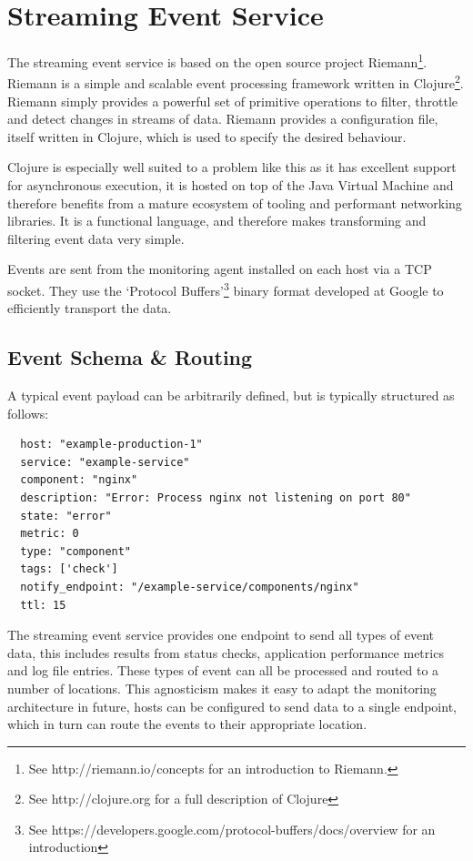 \documentclass{cshonours}
\begin{document}
\pagebreak
\section{Streaming Event Service}

The streaming event service is based on the open source project
Riemann\footnote{See http://riemann.io/concepts for an introduction to
Riemann.}. Riemann is a simple and scalable event processing framework written in Clojure\footnote{See http://clojure.org for a full description of Clojure}. Riemann simply provides a powerful set of primitive operations to filter, throttle and detect changes in streams of data. Riemann provides a configuration file, itself written in Clojure, which is used to specify the desired behaviour.

Clojure is especially well suited to a problem like this as it has excellent support for asynchronous execution, it is hosted on top of the Java Virtual Machine and therefore benefits from a mature ecosystem of tooling and performant networking libraries. It is a functional language, and therefore makes transforming and filtering event data very simple.

Events are sent from the monitoring agent installed on each host via a TCP
socket. They use the `Protocol Buffers'\footnote{See https://developers.google.com/protocol-buffers/docs/overview for an introduction} binary format developed at Google to efficiently transport the data.

\subsection{Event Schema \& Routing}

A typical event payload can be arbitrarily defined, but is typically structured as follows:

\begin{verbatim}
  host: "example-production-1"
  service: "example-service"
  component: "nginx"
  description: "Error: Process nginx not listening on port 80"
  state: "error"
  metric: 0
  type: "component"
  tags: ['check']
  notify_endpoint: "/example-service/components/nginx"
  ttl: 15
\end{verbatim}

The streaming event service provides one endpoint to send all types of event data, this includes results from status checks, application performance metrics and log file entries. These types of event can all be processed and routed to a number of locations. This agnosticism makes it easy to adapt the monitoring architecture in future, hosts can be configured to send data to a single endpoint, which in turn can route the events to their appropriate location.
\end{document}
